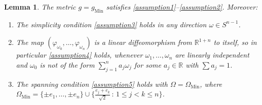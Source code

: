 \documentclass[11pt,letterpaper]{amsart}
\newtheorem{Lemma}[Theorem]{Lemma}
\theoremstyle{definition}
\numberwithin{equation}{section}
\newcommand{\mR}{\mathbb{R}}                    %
\newcommand{\gm}{g_{\mathrm{Min}}}
\begin{document}
\begin{Lemma} \label{lemma_minkowski_conditions}
The metric $g = \gm$ satisfies \eqref{assumption1}--\eqref{assumption2}. Moreover:
\begin{enumerate}
\item[(a)] 
The simplicity condition \eqref{assumption3} holds in any direction $\omega \in S^{n-1}$.
\item[(b)]
The map $(\varphi_{\omega_0}, \ldots, \varphi_{\omega_n})$ is a linear diffeomorphism from $\mR^{1+n}$ to itself, so in particular \eqref{assumption4} holds, whenever $\omega_1, \ldots, \omega_n$ are linearly independent and $\omega_0$ is not of the form $\sum_{j=1}^n a_j \omega_j$ for some $a_j \in \mR$ with $\sum a_j = 1$.
\item[(c)]
The spanning condition \eqref{assumption5} holds with $\Omega = \Omega_{\mathrm{Min}}$, where $\Omega_{\mathrm{Min}} = \{ \pm e_1, \ldots, \pm e_n \} \cup \{ \frac{e_j+e_k}{\sqrt{2}} \,:\, 1 \leq j < k \leq n \}$.
\end{enumerate}
\end{Lemma}
\end{document}
